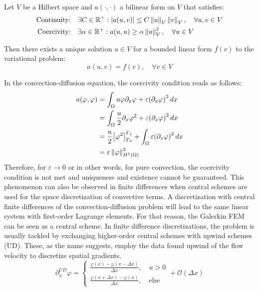 \begin{theorem}
	Let $V$ be a Hilbert space and $a(\cdot,\cdot)$ a bilinear form on $V$ that satisfies:
	\begin{align*}
		\text{Continuity:} & \quad \exists C\in \mathbb{R}^+ : |a(u,v)| \leq C\left\lVert u\right\rVert_V\left\lVert v\right\rVert_V, \quad \forall u,v\in V \\
		\text{Coercivity:} & \quad \exists \alpha\in \mathbb{R}^+ : a(u,u) \geq \alpha\left\lVert u\right\rVert_V^2, \quad \forall u\in V
	\end{align*}

	Then there exists a unique solution $u\in V$ for a bounded linear form $f(v)$ to the variational problem:
	\begin{equation*}
		a(u, v) = f(v), \quad \forall v\in V
	\end{equation*}
	\vspace*{1cm}
\end{theorem}
\noindent In the convection-diffusion equation, the coercivity condition reads as follows:
\begin{align*}
	a(\varphi, \varphi) & = \int_{\Omega} u\varphi\partial_x\varphi + \varepsilon{(\partial_x\varphi)}^2\,dx                                 \\
	                    & = \int_{\Omega} \frac{u}{2}\partial_x\varphi^2 + \varepsilon{(\partial_x\varphi)}^2\,dx                            \\
	                    & = \frac{u}{2}{\left[\varphi^2\right]}^{\Gamma_1}_{\Gamma_0} + \int_{\Omega} \varepsilon{(\partial_x\varphi)}^2\,dx \\
	                    & = \varepsilon \left\lVert\varphi\right\rVert^2_{H^1(\Omega)}
\end{align*}
Therefore, for $\varepsilon\rightarrow0$ or in other words, for pure convection, the coercivity condition is not met and uniqueness and existence cannot be guaranteed. This phenomenon can also be observed in finite differences when central schemes are used for the space discretization of convective terms. A discretization with central finite differences of the convection-diffusion problem will lead to the same linear system with first-order Lagrange elements. For that reason, the Galerkin FEM can be seen as a central scheme. In finite difference discretizations, the problem is usually tackled by exchanging higher-order central schemes with upwind schemes (UD). These, as the name suggests, employ the data found upwind of the flow velocity to discretize spatial gradients.
\begin{equation*}
	\partial^{UD}_x\varphi =
	\begin{cases} \frac{\varphi(x) - \varphi(x-\Delta x)}{\Delta x}, \quad u > 0 \\
		\frac{\varphi(x+\Delta x) - \varphi(x)}{\Delta x}, \quad \text{else}
	\end{cases} +\mathcal{O}(\Delta x)
\end{equation*}
